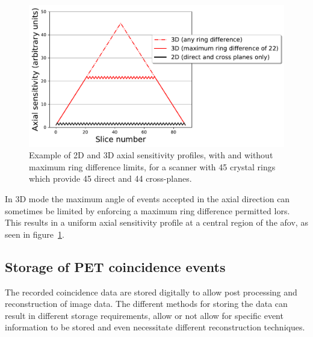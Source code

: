 \begin{figure} [ht!]
\centering
\includegraphics[scale=0.50,angle=0]{2_Theory_Methods/figures/2_2_2D3DSensitivityProfiles.pdf}
\caption{Example of 2D and 3D axial sensitivity profiles, with and without maximum ring difference limits, for a scanner with 45 crystal rings which provide 45 direct and 44 cross-planes.} 
\label{fig_2:2D3DSensitivityProfiles}
\end{figure} 
%
%
In 3D mode the maximum angle of events accepted in the axial direction can sometimes be limited by enforcing a maximum ring difference permitted \glspl{lor}. This results in a uniform axial sensitivity profile at a central region of the \gls{afov}, as seen in figure~\ref{fig_2:2D3DSensitivityProfiles}.
%
%
\subsection{Storage of PET coincidence events}
The recorded coincidence data are stored digitally to allow post processing and reconstruction of image data.
The different methods for storing the data can result in different storage requirements, allow or not allow for specific event information to be stored and even necessitate different reconstruction techniques. 

